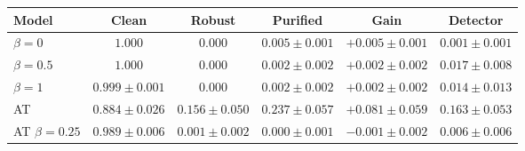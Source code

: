 \begin{tabular}{lccccc}
\toprule
Model & Clean & Robust & Purified & Gain & Detector \\
\midrule
$\beta=0$ & $\mathbf{1.000}$ & $0.000$ & $0.005 \pm 0.001$ & $+0.005 \pm 0.001$ & $0.001 \pm 0.001$ \\
$\beta=0.5$ & $\mathbf{1.000}$ & $0.000$ & $0.002 \pm 0.002$ & $+0.002 \pm 0.002$ & $0.017 \pm 0.008$ \\
$\beta=1$ & $0.999 \pm 0.001$ & $0.000$ & $0.002 \pm 0.002$ & $+0.002 \pm 0.002$ & $0.014 \pm 0.013$ \\
AT & $0.884 \pm 0.026$ & $\mathbf{0.156 \pm 0.050}$ & $\mathbf{0.237 \pm 0.057}$ & $\mathbf{+0.081 \pm 0.059}$ & $\mathbf{0.163 \pm 0.053}$ \\
AT $\beta=0.25$ & $0.989 \pm 0.006$ & $0.001 \pm 0.002$ & $0.000 \pm 0.001$ & $-0.001 \pm 0.002$ & $0.006 \pm 0.006$ \\
\bottomrule
\end{tabular}
